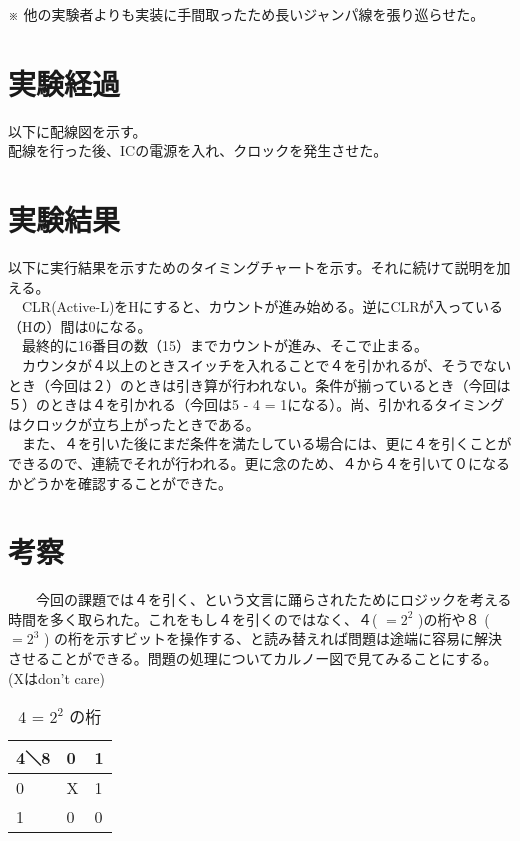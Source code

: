 \documentclass{scrartcl}
\begin{document}
※ 他の実験者よりも実装に手間取ったため長いジャンパ線を張り巡らせた。\\

\section{実験経過}
\label{sec:org4c10535}

以下に配線図を示す。\\
配線を行った後、ICの電源を入れ、クロックを発生させた。\\

\section{実験結果}
\label{sec:org87d42f7}
以下に実行結果を示すためのタイミングチャートを示す。それに続けて説明を加える。\\
　CLR(Active-L)をHにすると、カウントが進み始める。逆にCLRが入っている（Hの）間は0になる。\\
　最終的に16番目の数（15）までカウントが進み、そこで止まる。\\
　カウンタが４以上のときスイッチを入れることで４を引かれるが、そうでないとき（今回は２）のときは引き算が行われない。条件が揃っているとき（今回は５）のときは４を引かれる（今回は5 - 4 = 1になる）。尚、引かれるタイミングはクロックが立ち上がったときである。\\
　また、４を引いた後にまだ条件を満たしている場合には、更に４を引くことができるので、連続でそれが行われる。更に念のため、４から４を引いて０になるかどうかを確認することができた。\\

\section{考察}
\label{sec:org5ff96c9}
　　今回の課題では４を引く、という文言に踊らされたためにロジックを考える時間を多く取られた。これをもし４を引くのではなく、４( \(=2^2\) )の桁や８ ( \(=2^3\) ) の桁を示すビットを操作する、と読み替えれば問題は途端に容易に解決させることができる。問題の処理についてカルノー図で見てみることにする。(Xはdon't care)\\

\begin{table}[htbp]
\caption{4 = \(2^2\) の桁}
\centering
\begin{tabular}{|l|l|l|}
\hline
4＼8 & 0 & 1\\
\hline
0 & X & 1\\
1 & 0 & 0\\
\hline
\end{tabular}
\end{table}
\end{document}
